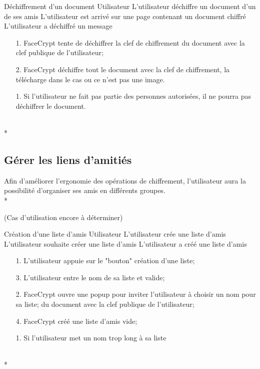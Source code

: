 \documentclass[a4paper,11pt,french]{article}
\begin{document}
\fiche
	{Déchiffrement d'un document}
	{Utilisateur}
	{L'utilisateur déchiffre un document d'un de ses amis}
	{}
	{L'utilisateur est arrivé sur une page contenant un document chiffré}
	{L'utilisateur a déchiffré un message}
    {}
	{\begin{itemize}
        \item[]
		\item[1.] FaceCrypt tente de déchiffrer la clef de chiffrement
            du document avec la clef publique de l'utilisateur;
		\item[2.] FaceCrypt déchiffre tout le document avec la clef
            de chiffrement, la télécharge dans le cas ou ce n'est pas
            une image.
	\end{itemize}
	}
	{}
\flots
    {}
    {\begin{itemize}
    \item[]
    \item[1.] Si l'utilisateur ne fait pas partie des personnes
        autorisées, il ne pourra pas déchiffrer le document.
    \end{itemize}
    }
	{}    
\\*

\subsection{Gérer les liens d'amitiés}
Afin d'améliorer l'ergonomie des opérations de chiffrement, 
l'utilisateur aura la possibilité d'organiser ses amis en
différents groupes. \\*

(Cas d'utilisation encore à déterminer)

\fiche
	{Création d'une liste d'amis}
	{Utilisateur}
    {L'utilisateur crée une liste d'amis}
    {}
    {L'utilisateur souhaite créer une liste d'amis}
	{L'utilisateur a créé une liste d'amis}
    {\begin{itemize}
        \item[]
        \item[1.] L'utilisateur appuie sur le "bouton" création
            d'une liste;
        \item[3.] L'utilisateur entre le nom de sa liste et valide;
        
    \end{itemize}}
	{\begin{itemize}
        \item[]
		\item[2.] FaceCrypt ouvre une popup pour inviter l'utilisateur
            à choisir un nom pour sa liste;
            du document avec la clef publique de l'utilisateur;
		\item[4.] FaceCrypt créé une liste d'amis vide;
	\end{itemize}
	}
	{}
\flots
    {\begin{itemize}
    \item[]
    \item[1.] Si l'utilisateur met un nom trop long à sa liste
    \end{itemize}
    }
    {}
\\*
\end{document}
